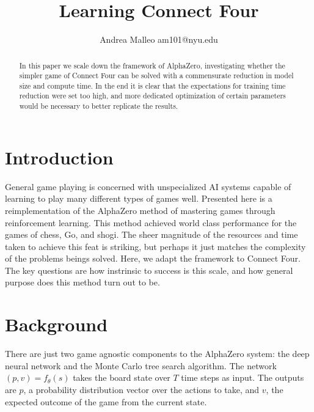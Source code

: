 \documentclass[twoside,11pt]{article}
\begin{document}
\title{Learning Connect Four}

\author{\name Andrea Malleo \email am101@nyu.edu \\}

\maketitle

\begin{abstract}%
In this paper we scale down the framework of AlphaZero,
investigating whether the simpler game of Connect Four can be solved with a commensurate
reduction in model size and compute time. In the end it is clear that the expectations 
for training time reduction were set too high, and more dedicated optimization of certain parameters
would be necessary to better replicate the results. 
\end{abstract}

  
 
\section{Introduction}
General game playing %
 is concerned with unspecialized AI systems
capable of learning to play many different types of games well. Presented here is a reimplementation of the AlphaZero 
\cite{AlphaZero}method of 
mastering games through reinforcement learning. This method achieved world class performance for 
the games of chess, Go, and shogi.  The sheer magnitude of the resources and time taken to achieve this feat 
is striking, 
but perhaps it just matches the complexity of the problems beings solved. Here, we adapt the framework to Connect Four.
The key questions are how instrinsic to success is this scale, and how general purpose does this method turn out to be.


\section{Background}
There are just two game agnostic components to the AlphaZero system: the deep neural network and the
Monte Carlo tree search algorithm. The network $(p,v) = f_{\theta}(s)$
takes the board state over $T$ time steps as input. The outputs are $p$, a probability distribution vector
over the actions to take, and  $v$, the expected outcome of the game from the current state.
\end{document}
